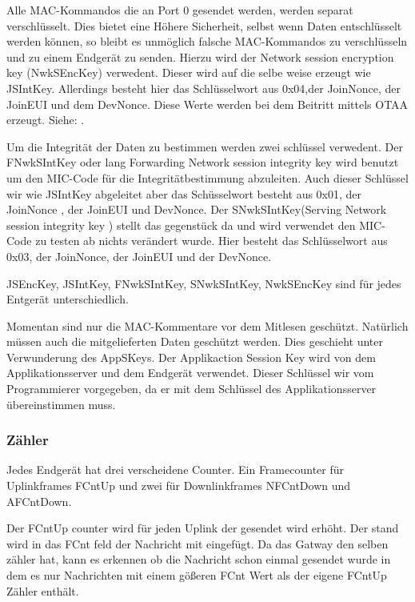 \documentclass[a4paper,12pt]{article}
\begin{document}
            Alle MAC-Kommandos die an Port 0 gesendet werden, werden separat verschlüsselt. Dies bietet eine Höhere 
            Sicherheit, selbst wenn Daten entschlüsselt werden können, so bleibt es unmöglich falsche MAC-Kommandos zu 
            verschlüsseln und zu einem Endgerät zu senden. Hierzu wird der Network session encryption key (NwkSEncKey) 
            verwedent. Dieser wird auf die selbe weise erzeugt wie JSIntKey. Allerdings besteht hier das Schlüsselwort 
            aus 0x04,der JoinNonce, der JoinEUI und dem DevNonce. Diese Werte werden bei dem Beitritt mittels OTAA 
            erzeugt. Siehe: .

            Um die Integrität der Daten zu bestimmen werden zwei schlüssel verwedent. Der FNwkSIntKey oder lang Forwarding 
            Network session integrity key wird benutzt um den MIC-Code für die Integritätbestimmung abzuleiten. Auch 
            dieser Schlüssel wir wie JSIntKey abgeleitet aber das Schüsselwort besteht aus 0x01, der JoinNonce , der 
            JoinEUI und DevNonce. Der SNwkSIntKey(Serving Network session integrity key ) stellt das gegenstück da und 
            wird verwendet den MIC-Code zu testen ab nichts verändert wurde. Hier besteht das Schlüsselwort aus 0x03, der 
            JoinNonce, der JoinEUI und der DevNonce.

            JSEncKey, JSIntKey, FNwkSIntKey, SNwkSIntKey, NwkSEncKey sind für jedes Entgerät unterschiedlich.

            Momentan sind nur die MAC-Kommentare vor dem Mitlesen geschützt. Natürlich müssen auch die mitgelieferten 
            Daten geschützt werden. Dies geschieht unter Verwunderung des AppSKeys. Der Applikaction Session Key wird von 
            dem Applikationsserver und dem Endgerät verwendet. Dieser Schlüssel wir vom Programmierer vorgegeben, da er 
            mit dem Schlüssel des Applikationsserver übereinstimmen muss.\cite[S.50 ff]{LoRaSpec}

        \subsubsection{Zähler}
            Jedes Endgerät hat drei verscheidene Counter. Ein Framecounter für Uplinkframes FCntUp und zwei für 
            Downlinkframes NFCntDown und AFCntDown. 

            Der FCntUp counter wird für jeden Uplink der gesendet wird erhöht. Der stand wird in das FCnt feld der 
            Nachricht mit eingefügt. Da das Gatway den selben zähler hat, kann es erkennen ob die Nachricht schon einmal 
            gesendet wurde in dem es nur Nachrichten mit einem gößeren FCnt Wert als der eigene FCntUp Zähler enthält.
\end{document}
